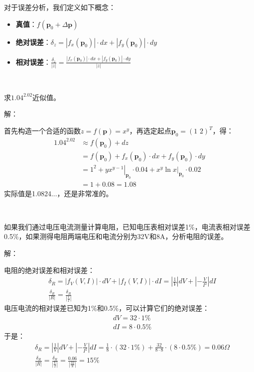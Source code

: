对于误差分析，我们定义如下概念：
\begin{itemize}
    \item {\bf 真值}：$f\left( \boldsymbol{p}_0+\Delta \boldsymbol{p} \right) $
    \item {\bf 绝对误差}：$\delta _z=\left| f_x\left( \boldsymbol{p}_0 \right) \right|\cdot dx+\left| f_y\left( \boldsymbol{p}_0 \right) \right|\cdot dy$
    \item {\bf 相对误差}：$\frac{\delta _z}{\left| z \right|}=\frac{\left| f_x\left( \boldsymbol{p}_0 \right) \right|\cdot dx+\left| f_y\left( \boldsymbol{p}_0 \right) \right|\cdot dy}{\left| z \right|}$
\end{itemize}

~

\begin{example}
求$1.04^{2.02}$近似值。
\end{example}

解：

首先构造一个合适的函数$z=f\left( \boldsymbol{p} \right) =x^y$，再选定起点$\boldsymbol{p}_0=\left( 1\,\,2 \right) ^T$，得：
\begin{align*}
1.04^{2.02}&\approx f\left( \boldsymbol{p}_0 \right) +dz \\
&=f\left( \boldsymbol{p}_0 \right) +f_x\left( \boldsymbol{p}_0 \right) \cdot dx+f_y\left( \boldsymbol{p}_0 \right) \cdot dy \\
&=1^2+\left. yx^{y-1} \right|_{\boldsymbol{p}_0}\cdot 0.04+\left. x^y\ln x \right|_{\boldsymbol{p}_0}\cdot 0.02 \\
&=1+0.08=1.08
\end{align*}
实际值是1.0824...，还是非常准的。


~

\begin{example}
如果我们通过电压电流测量计算电阻，已知电压表相对误差1\%，电流表相对误差0.5\%，如果测得电阻两端电压和电流分别为32V和8A，分析电阻的误差。
\end{example}

解：

电阻的绝对误差和相对误差：
\begin{align*}
&\delta _R=\left| f_V\left( V,I \right) \right|\cdot dV+\left| f_I\left( V,I \right) \right|\cdot dI=\left| \frac{1}{V} \right|dV+\left| -\frac{V}{I^2} \right|dI \\
&\frac{\delta _R}{\left| R \right|}=\frac{\delta _R}{\left| \frac{V}{I} \right|}
\end{align*}
电压电流的相对误差已知为1\%和0.5\%，可以计算它们的绝对误差：
\begin{align*}
&dV=32\cdot 1\% \\
&dI=8\cdot 0.5\%
\end{align*}
于是：
\begin{align*}
&\delta _R=\left| \frac{1}{V} \right|dV+\left| -\frac{V}{I^2} \right|dI=\frac{1}{8}\cdot \left( 32\cdot 1\% \right) +\frac{32}{8\cdot 8}\cdot \left( 8\cdot 0.5\% \right) =0.06\Omega \\
&\frac{\delta _R}{\left| R \right|}=\frac{\delta _R}{\left| \frac{V}{I} \right|}=\frac{0.06}{\left| \frac{32}{8} \right|}=15\%
\end{align*}




